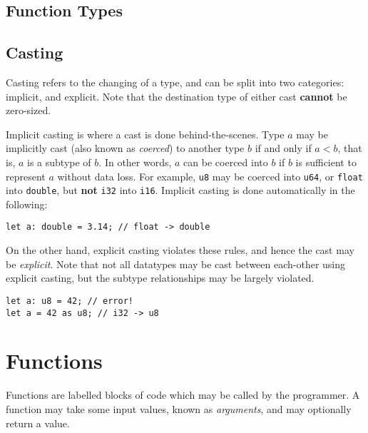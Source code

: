 \documentclass{article}
\begin{document}
    \subsection{Function Types}\label{subsec:function-types}


    \subsection{Casting}\label{subsec:type-casting}

    Casting refers to the changing of a type, and can be split into two categories: implicit, and explicit.
    Note that the destination type of either cast \textbf{cannot} be zero-sized.

    Implicit casting is where a cast is done behind-the-scenes.
    Type \(a\) may be implicitly cast (also known as \textit{coerced}) to another type \(b\) if and only if \(a < b\), that is, \(a\) is a subtype of \(b\).
    In other words, \(a\) can be coerced into \(b\) if \(b\) is sufficient to represent \(a\) without data loss.
    For example, \texttt{u8} may be coerced into \texttt{u64}, or \texttt{float} into \texttt{double}, but \textbf{not} \texttt{i32} into \texttt{i16}.
    Implicit casting is done automatically in the following:

    \begin{lstlisting}[language=CustomLang]
let a: double = 3.14; // float -> double
    \end{lstlisting}

    On the other hand, explicit casting violates these rules, and hence the cast may be \textit{explicit}.
    Note that not all datatypes may be cast between each-other using explicit casting, but the subtype relationships may be largely violated.

    \begin{lstlisting}[language=CustomLang]
let a: u8 = 42; // error!
let a = 42 as u8; // i32 -> u8
    \end{lstlisting}

    \section{Functions}\label{sec:functions}

    Functions are labelled blocks of code which may be called by the programmer.
    A function may take some input values, known as \textit{arguments}, and may optionally return a value.
\end{document}
